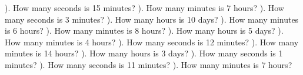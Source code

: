\documentclass{article}%
\begin{document}
\newline%
). How many seconds is 15 minutes?%
\newline%
\newline%
). How many minutes is 7 hours?%
\newline%
\newline%
). How many seconds is 3 minutes?%
\newline%
\newline%
). How many hours is 10 days?%
\newline%
\newline%
). How many minutes is 6 hours?%
\newline%
\newline%
). How many minutes is 8 hours?%
\newline%
\newline%
). How many hours is 5 days?%
\newline%
\newline%
). How many minutes is 4 hours?%
\newline%
\newline%
). How many seconds is 12 minutes?%
\newline%
\newline%
). How many minutes is 14 hours?%
\newline%
\newline%
). How many hours is 3 days?%
\newline%
\newline%
). How many seconds is 1 minutes?%
\newline%
\newline%
). How many seconds is 11 minutes?%
\newline%
\newline%
). How many minutes is 7 hours?%
\newline%
\newline%
\end{document}
